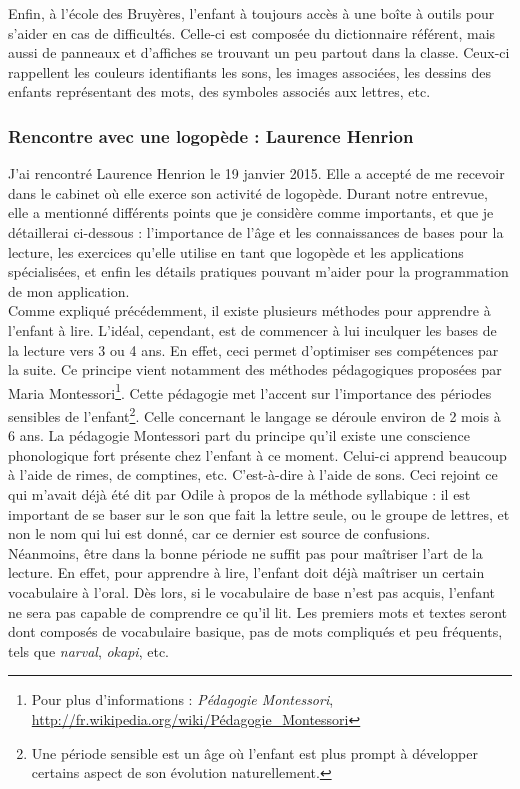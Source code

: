 Enfin, à l'école des Bruyères, l'enfant à toujours accès à une boîte à outils pour s'aider en cas de difficultés. Celle-ci est composée du dictionnaire référent, mais aussi de panneaux et d'affiches se trouvant un peu partout dans la classe. Ceux-ci rappellent les couleurs identifiants les sons, les images associées, les dessins des enfants représentant des mots, des symboles associés aux lettres, etc.

\subsubsection{Rencontre avec une logopède : Laurence Henrion}
J'ai rencontré Laurence Henrion le 19 janvier 2015. Elle a accepté de me recevoir dans le cabinet où elle exerce son activité de logopède. Durant notre entrevue, elle a mentionné différents points que je considère comme importants, et que je détaillerai ci-dessous : l'importance de l'âge et les connaissances de bases pour la lecture, les exercices qu'elle utilise en tant que logopède et les applications spécialisées, et enfin les détails pratiques pouvant m'aider pour la programmation de mon application.\\

Comme expliqué précédemment, il existe plusieurs méthodes pour apprendre à l'enfant à lire. L'idéal, cependant, est de commencer à lui inculquer les bases de la lecture vers 3 ou 4 ans. En effet, ceci permet d'optimiser ses compétences par la suite. Ce principe vient notamment des méthodes pédagogiques proposées par Maria Montessori\footnote{Pour plus d'informations : \textit{Pédagogie Montessori}, \url{http://fr.wikipedia.org/wiki/Pédagogie_Montessori}}. Cette pédagogie met l'accent sur l'importance des périodes sensibles de l'enfant\footnote{Une période sensible est un âge où l'enfant est plus prompt à développer certains aspect de son évolution naturellement.}. Celle concernant le langage se déroule environ de 2 mois à 6 ans. La pédagogie Montessori part du principe qu'il existe une conscience phonologique fort présente chez l'enfant à ce moment. Celui-ci apprend beaucoup à l'aide de rimes, de comptines, etc. C'est-à-dire à l'aide de sons. Ceci rejoint ce qui m'avait déjà été dit par Odile à propos de la méthode syllabique : il est important de se baser sur le son que fait la lettre seule, ou le groupe de lettres, et non le nom qui lui est donné, car ce dernier est source de confusions.\\

Néanmoins, être dans la bonne période ne suffit pas pour maîtriser l'art de la lecture. En effet, pour apprendre à lire, l'enfant doit déjà maîtriser un certain vocabulaire à l'oral. Dès lors, si le vocabulaire de base n'est pas acquis, l'enfant ne sera pas capable de comprendre ce qu'il lit. Les premiers mots et textes seront dont composés de vocabulaire basique, pas de mots compliqués et peu fréquents, tels que \textit{narval}, \textit{okapi}, etc.\\

